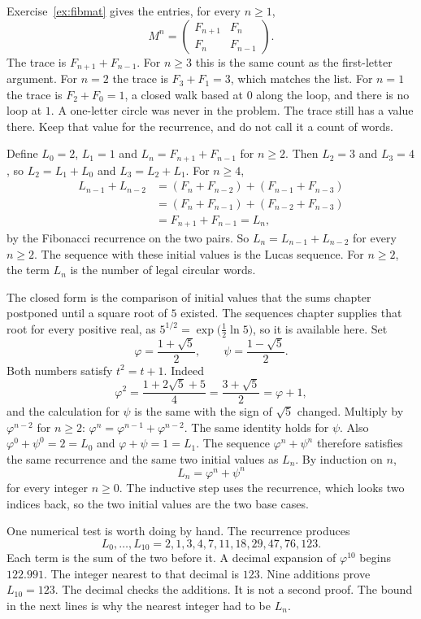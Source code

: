Exercise~\ref{ex:fibmat} gives the entries, for every $n\ge1$,
\[
M^n=\begin{pmatrix}F_{n+1}&F_n\\F_n&F_{n-1}\end{pmatrix}.
\]
The trace is $F_{n+1}+F_{n-1}$. For $n\ge3$ this is the same count as the first-letter argument. For $n=2$ the trace is $F_3+F_1=3$, which matches the list. For $n=1$ the trace is $F_2+F_0=1$, a closed walk based at $0$ along the loop, and there is no loop at $1$. A one-letter circle was never in the problem. The trace still has a value there. Keep that value for the recurrence, and do not call it a count of words.

Define $L_0=2$, $L_1=1$ and $L_n=F_{n+1}+F_{n-1}$ for $n\ge2$. Then $L_2=3$ and $L_3=4$, so $L_2=L_1+L_0$ and $L_3=L_2+L_1$. For $n\ge4$,
\begin{align*}
L_{n-1}+L_{n-2}
&=(F_n+F_{n-2})+(F_{n-1}+F_{n-3})\\
&=(F_n+F_{n-1})+(F_{n-2}+F_{n-3})\\
&=F_{n+1}+F_{n-1}=L_n,
\end{align*}
by the Fibonacci recurrence on the two pairs. So $L_{n}=L_{n-1}+L_{n-2}$ for every $n\ge2$. The sequence with these initial values is the Lucas sequence. For $n\ge2$, the term $L_n$ is the number of legal circular words.

The closed form is the comparison of initial values that the sums chapter postponed until a square root of $5$ existed. The sequences chapter supplies that root for every positive real, as $5^{1/2}=\exp\bigl(\frac12\ln 5\bigr)$, so it is available here. Set
\[
\varphi=\frac{1+\sqrt5}2,\qquad\psi=\frac{1-\sqrt5}2.
\]
Both numbers satisfy $t^2=t+1$. Indeed
\[
\varphi^2=\frac{1+2\sqrt5+5}4=\frac{3+\sqrt5}2=\varphi+1,
\]
and the calculation for $\psi$ is the same with the sign of $\sqrt5$ changed. Multiply by $\varphi^{n-2}$ for $n\ge2$: $\varphi^n=\varphi^{n-1}+\varphi^{n-2}$. The same identity holds for $\psi$. Also $\varphi^0+\psi^0=2=L_0$ and $\varphi+\psi=1=L_1$. The sequence $\varphi^n+\psi^n$ therefore satisfies the same recurrence and the same two initial values as $L_n$. By induction on $n$,
\[
L_n=\varphi^n+\psi^n
\]
for every integer $n\ge0$. The inductive step uses the recurrence, which looks two indices back, so the two initial values are the two base cases.

One numerical test is worth doing by hand. The recurrence produces
\[
L_0,\dots,L_{10}=2,1,3,4,7,11,18,29,47,76,123.
\]
Each term is the sum of the two before it. A decimal expansion of $\varphi^{10}$ begins $122.991$. The integer nearest to that decimal is $123$. Nine additions prove $L_{10}=123$. The decimal checks the additions. It is not a second proof. The bound in the next lines is why the nearest integer had to be $L_n$.

